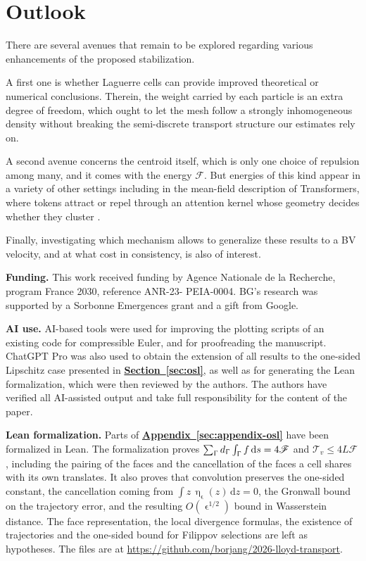 \documentclass[letterpaper,11pt,twoside]{article}
\numberwithin{figure}{section}
\numberwithin{table}{section}
\theoremstyle{cpamplain}
\theoremstyle{cpamdefinition}
\newcommand{\diff}{\mathrm{d}}
\newcommand{\Secref}[1]{\textbf{\hyperref[#1]{Section~\ref*{#1}}}}
\newcommand{\Appref}[1]{\textbf{\hyperref[#1]{Appendix~\ref*{#1}}}}
\let\varepsilon\upvarepsilon
\let\eta\upeta
\let\Gamma\Upgamma
\renewcommand{\le}{\leqslant}
\numberwithin{equation}{section}
\begin{document}


\section{Outlook}\label{sec:outlook}

There are several avenues that remain to be explored regarding various enhancements of the proposed stabilization. 

A first one is whether Laguerre cells can provide improved theoretical or numerical conclusions. Therein, the weight carried by each particle is an extra degree of freedom, which ought to let the mesh follow a strongly inhomogeneous density without breaking the semi-discrete transport structure our estimates rely on.

A second avenue concerns the centroid itself, which is only one choice of repulsion among many, and it comes with the energy $\mathscr F$. But energies of this kind appear in a variety of other settings including in the mean-field description of Transformers, where tokens attract or repel through an attention kernel whose geometry decides whether they cluster \cite{geshkovski2023emergence,geshkovski2025mathematical,alcalde2025attention}. 

Finally, investigating which mechanism allows to generalize these results to a BV velocity, and at what cost in consistency, is also of interest.

\smallskip

\noindent
\textbf{Funding.} This work received funding by Agence Nationale de la Recherche, program France 2030, reference ANR-23- PEIA-0004.
BG’s research was supported by a Sorbonne Emergences grant and a gift from Google.

\smallskip

\noindent
\textbf{AI use.} AI-based tools were used for improving the plotting scripts of an existing code for compressible Euler, and for proofreading the manuscript. 
ChatGPT Pro was also used to obtain the extension of all results to the one-sided Lipschitz case presented in \Secref{sec:osl}, as well as for generating the Lean formalization, which were then reviewed by the authors.  The authors have verified all AI-assisted output and take full responsibility for the content of the paper.

\smallskip

\noindent
\textbf{Lean formalization.} Parts of \Appref{sec:appendix-osl} have been formalized in Lean.
The formalization proves $\sum_\Gamma d_\Gamma\int_\Gamma f\,\diff s=4\mathscr F$ and $\mathscr T_v\le4L\mathscr F$, including the pairing of the faces and the cancellation of the faces a cell shares with its own translates.
It also proves that convolution preserves the one-sided constant, the cancellation coming from $\int z\,\eta_\varepsilon(z)\,\diff z=0$, the Gronwall bound on the trajectory error, and the resulting $O(\varepsilon^{1/2})$ bound in Wasserstein distance.
The face representation, the local divergence formulas, the existence of trajectories and the one-sided bound for Filippov selections are left as hypotheses.
The files are at \url{https://github.com/borjang/2026-lloyd-transport}.
\end{document}
